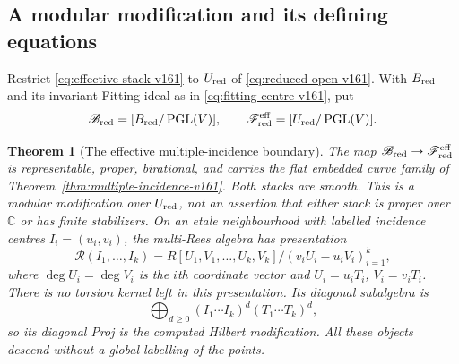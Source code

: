 \documentclass[11pt,reqno]{amsart}
\numberwithin{equation}{section}
\newtheorem{theorem}{Theorem}[section]
\theoremstyle{definition}\newtheorem{definition}[theorem]{Definition}
\theoremstyle{remark}\newtheorem{remark}[theorem]{Remark}
\newcommand{\C}{\mathbb C}\newcommand{\Q}{\mathbb Q}
\begin{document}
\subsection{A modular modification and its defining equations}
Restrict \eqref{eq:effective-stack-v161} to $U_{\rm red}$ of
\eqref{eq:reduced-open-v161}. With $B_{\rm red}$ and its invariant
Fitting ideal as in \eqref{eq:fitting-centre-v161}, put
\begin{equation}\label{eq:boundary-stack-v161}
 \mathscr B_{\rm red}=[B_{\rm red}/\operatorname{PGL}(V)],\qquad
 \mathscr F_{\rm red}^{\rm eff}=[U_{\rm red}/\operatorname{PGL}(V)].
\end{equation}

\begin{theorem}[The effective multiple-incidence boundary]
\label{thm:boundary-stack-v161}
The map $\mathscr B_{\rm red}\to\mathscr F_{\rm red}^{\rm eff}$
is representable, proper, birational, and carries the flat embedded
curve family of Theorem~\ref{thm:multiple-incidence-v161}. Both stacks
are smooth. This is a modular modification over $U_{\rm red}$, not
an assertion that either stack is proper over $\C$ or has finite
stabilizers. On an etale neighbourhood with labelled incidence
centres $I_i=(u_i,v_i)$, the multi-Rees algebra has presentation
\begin{equation}\label{eq:multi-Rees-v161}
 \mathcal R(I_1,\ldots,I_k)
 =R[U_1,V_1,\ldots,U_k,V_k]/(v_iU_i-u_iV_i)_{i=1}^k,
\end{equation}
where $\deg U_i=\deg V_i$ is the $i$th coordinate vector and
$U_i=u_iT_i$, $V_i=v_iT_i$. There is no torsion kernel left in this
presentation. Its diagonal subalgebra is
\begin{equation}\label{eq:diagonal-Rees-v161}
 \bigoplus_{d\geq0}(I_1\cdots I_k)^d(T_1\cdots T_k)^d,
\end{equation}
so its diagonal Proj is the computed Hilbert modification.
All these objects descend without a global labelling of the points.
\end{theorem}
\end{document}
